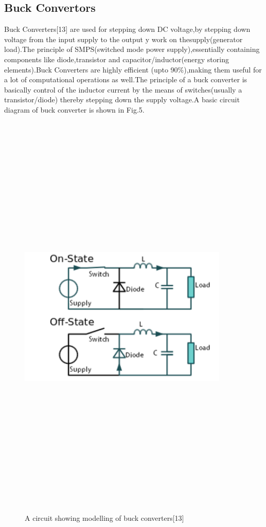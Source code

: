\subsection{Buck Convertors}
Buck Converters[13] are used for stepping down DC voltage,by stepping down voltage from the input supply to the output y work on thesupply(generator load).The principle of  SMPS(switched mode power supply),essentially containing components like diode,transistor and capacitor/inductor(energy storing elements).Buck Converters are highly efficient (upto 90\%),making them useful for a lot of computational operations as well.The principle of  a buck converter is basically control of  the inductor current by the means of  switches(usually a transistor/diode) thereby stepping down the supply voltage.A basic circuit diagram of  buck converter is shown in Fig.5.
\begin{center}
\begin{figure}
\includegraphics[width=10cm,height=20cm,keepaspectratio]{5.png}
\caption{ A circuit showing modelling of buck converters[13]}
\label{Fig:5}    
\end{figure}
\end{center}
